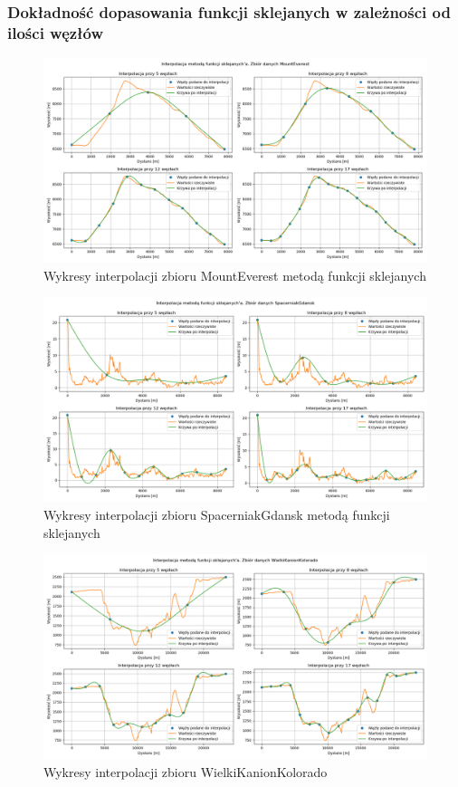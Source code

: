 \documentclass{article} %
\begin{document}
\subsubsection{Dokładność dopasowania funkcji sklejanych w zależności od ilości węzłów}
\begin{figure}[H]
    \centering
    \includegraphics[scale=0.47]{../plots/splines_MountEverest.png}
    \caption{Wykresy interpolacji zbioru MountEverest metodą funkcji sklejanych}
\end{figure}
\begin{figure}[H]
    \centering
    \includegraphics[scale=0.47]{../plots/splines_SpacerniakGdansk.png}
    \caption{Wykresy interpolacji zbioru SpacerniakGdansk metodą funkcji sklejanych}    
\end{figure}
\begin{figure}[H]
    \centering
    \includegraphics[scale=0.47]{../plots/splines_WielkiKanionKolorado.png}
    \caption{Wykresy interpolacji zbioru WielkiKanionKolorado}    
\end{figure}
\end{document}
